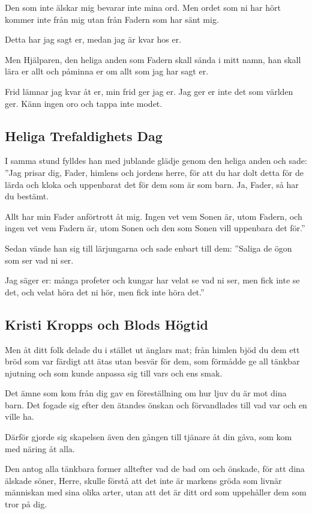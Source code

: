 Den som inte älskar mig bevarar inte mina ord. Men ordet som ni har hört kommer inte från mig utan från Fadern som har sänt mig.

Detta har jag sagt er, medan jag är kvar hos er. 

Men Hjälparen, den heliga anden som Fadern skall sända i mitt namn, han skall lära er allt och påminna er om allt som jag har sagt er. 

Frid lämnar jag kvar åt er, min frid ger jag er. Jag ger er inte det som världen ger. Känn ingen oro och tappa inte modet.


\subsection{Heliga Trefaldighets Dag}
{I samma stund fylldes han med jublande glädje} genom den heliga anden och sade: ''Jag prisar dig, Fader, himlens och jordens herre, för att du har dolt detta för de lärda och kloka och uppenbarat det för dem som är som barn. Ja, Fader, så har du bestämt. 

Allt har min Fader anförtrott åt mig. Ingen vet vem Sonen är, utom Fadern, och ingen vet vem Fadern är, utom Sonen och den som Sonen vill uppenbara det för.'' 

Sedan vände han sig till lärjungarna och sade enbart till dem: ''Saliga de ögon som ser vad ni ser. 

Jag säger er: många profeter och kungar har velat se vad ni ser, men fick inte se det, och velat höra det ni hör, men fick inte höra det.''


\subsection{Kristi Kropps och Blods Högtid}
{Men åt ditt folk delade du i stället ut änglars mat;} från himlen bjöd du dem
ett bröd som var färdigt att ätas utan besvär för dem, som förmådde ge all tänkbar njutning och som kunde anpassa sig till vars och ens smak.

 Det ämne som
kom från dig gav en föreställning om hur ljuv du är mot dina barn. Det fogade
sig efter den ätandes önskan och förvandlades till vad var och en ville ha. 

Därför gjorde sig skapelsen även den gången till tjänare åt din gåva, som kom
med näring åt alla.

 Den antog alla tänkbara former alltefter vad de bad om och
önskade, för att dina älskade söner, Herre, skulle förstå att det inte är markens gröda som livnär människan med sina olika arter, utan att det är ditt ord
som uppehåller dem som tror på dig.

